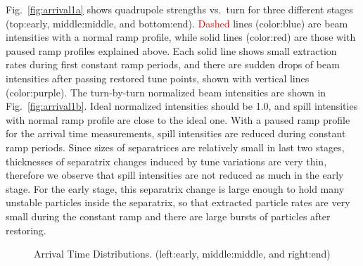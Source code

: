 \documentclass[aps,prstab,onecolumn,preprint]{revtex4-1}
\begin{document}
Fig.~\ref{fig:arrival1a} shows quadrupole strengths vs.~turn for three different stages (top:early, middle:middle, and bottom:end). \textcolor{red}{Dashed} lines (color:blue) are beam intensities with a normal ramp profile, while solid lines (color:red) are those with paused ramp profiles explained above. Each solid line shows small extraction rates during first constant ramp periods, and there are sudden drops of beam intensities after passing restored tune points, shown with vertical lines (color:purple). The turn-by-turn normalized beam intensities are shown in Fig.~\ref{fig:arrival1b}. Ideal normalized intensities should be 1.0, and spill intensities with normal ramp profile are close to the ideal one. With a paused ramp profile for the arrival time measurements, spill intensities are reduced during constant ramp periods. Since sizes of separatrices are relatively small in last two stages, thicknesses of separatrix changes induced by tune variations are very thin, therefore we observe that spill intensities are not reduced as much in the early stage. For the early stage, this separatrix change is large enough to hold many unstable particles inside the separatrix, so that extracted particle rates are very small during the constant ramp and there are large bursts of particles after restoring. 

\begin{figure}[!tbp]
  \caption{\label{fig:arrival2}Arrival Time Distributions. (left:early, middle:middle, and right:end)}
\end{figure}
\end{document}
